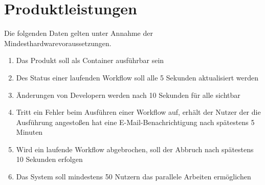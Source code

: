 \chapter{Produktleistungen}
Die folgenden Daten gelten unter Annahme der Mindesthardwarevoraussetzungen. %

\renewcommand{\labelenumi}{/PL\arabic{enumi}0/}
\begin{enumerate}
    \setlength\itemsep{-1em}
    \item Das Produkt soll als Container ausführbar sein
    \item Des Status einer laufenden \gls{Workflow} soll alle 5 Sekunden aktualisiert werden
    \item Änderungen von Developern werden nach 10 Sekunden für alle sichtbar
    \item Tritt ein Fehler beim Ausführen einer \gls{Workflow} auf, erhält der Nutzer der die Ausführung angestoßen hat eine E-Mail-Benachrichtigung nach spätestens 5 Minuten
    \item Wird ein laufende \gls{Workflow} abgebrochen, soll der Abbruch nach spätestens 10 Sekunden erfolgen
    \item Das System soll mindestens 50 Nutzern das parallele Arbeiten ermöglichen
    
    
\end{enumerate}